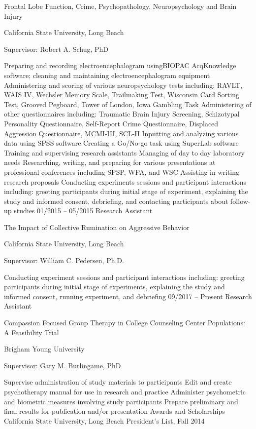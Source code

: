 \documentclass[
]{article}
\begin{document}
Frontal Lobe Function, Crime, Psychopathology, Neuropsychology and Brain Injury

California State University, Long Beach

Supervisor: Robert A. Schug, PhD

Preparing and recording electroencephalogram usingBIOPAC AcqKnowledge software; cleaning and maintaining electroencephalogram equipment
Administering and scoring of various neuropsychology tests including: RAVLT, WAIS IV, Wechsler Memory Scale, Trailmaking Test, Wisconsin Card Sorting Test, Grooved Pegboard, Tower of London, Iowa Gambling Task
Administering of other questionnaires including: Traumatic Brain Injury Screening, Schizotypal Personality Questionnaire, Self-Report Crime Questionnaire, Displaced Aggression Questionnaire, MCMI-III, SCL-II
Inputting and analyzing various data using SPSS software
Creating a Go/No-go task using SuperLab software
Training and supervising research assistants
Managing of day to day laboratory needs
Researching, writing, and preparing for various presentations at professional conferences including SPSP, WPA, and WSC
Assisting in writing research proposals
Conducting experiments sessions and participant interactions including: greeting participants during initial stage of experiment, explaining the study and informed consent, debriefing, and contacting participants about follow-up studies
01/2015 -- 05/2015 Research Assistant

The Impact of Collective Rumination on Aggressive Behavior

California State University, Long Beach

Supervisor: William C. Pedersen, Ph.D.

Conducting experiment sessions and participant interactions including: greeting participants during initial stage of experiments, explaining the study and informed consent, running experiment, and debriefing
09/2017 -- Present Research Assistant

Compassion Focused Group Therapy in College Counseling Center Populations: A Feasibility Trial

Brigham Young University

Supervisor: Gary M. Burlingame, PhD

Supervise administration of study materials to participants
Edit and create psychotherapy manual for use in research and practice
Administer psychometric and biometric measures involving study participants
Prepare preliminary and final results for publication and/or presentation
Awards and Scholarships
California State University, Long Beach President's List, Fall 2014
\end{document}
